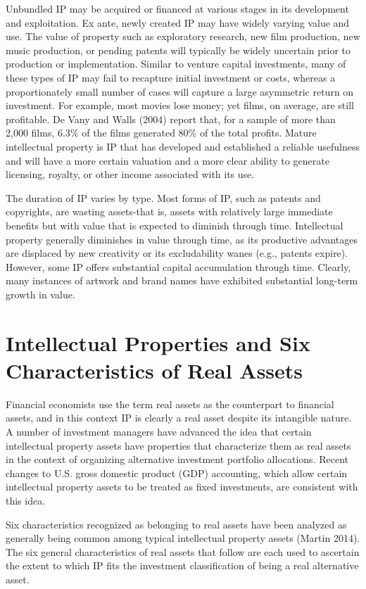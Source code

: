 \documentclass[11pt]{article}
\begin{document}
Unbundled IP may be acquired or financed at various stages in its development and exploitation. Ex ante, newly created IP may have widely varying value and use. The value of property such as exploratory research, new film production, new music production, or pending patents will typically be widely uncertain prior to production or implementation. Similar to venture capital investments, many of these types of IP may fail to recapture initial investment or costs, whereas a proportionately small number of cases will capture a large asymmetric return on investment. For example, most movies lose money; yet films, on average, are still profitable. De Vany and Walls (2004) report that, for a sample of more than 2,000 films, $6.3 \%$ of the films generated $80 \%$ of the total profits. Mature intellectual property is IP that has developed and established a reliable usefulness and will have a more certain valuation and a more clear ability to generate licensing, royalty, or other income associated with its use.

The duration of IP varies by type. Most forms of IP, such as patents and copyrights, are wasting assets-that is, assets with relatively large immediate benefits but with value that is expected to diminish through time. Intellectual property generally diminishes in value through time, as its productive advantages are displaced by new creativity or its excludability wanes (e.g., patents expire). However, some IP offers substantial capital accumulation through time. Clearly, many instances of artwork and brand names have exhibited substantial long-term growth in value.

\section*{Intellectual Properties and Six Characteristics of Real Assets}
Financial economists use the term real assets as the counterpart to financial assets, and in this context IP is clearly a real asset despite its intangible nature. A number of investment managers have advanced the idea that certain intellectual property assets have properties that characterize them as real assets in the context of organizing alternative investment portfolio allocations. Recent changes to U.S. gross domestic product (GDP) accounting, which allow certain intellectual property assets to be treated as fixed investments, are consistent with this idea.

Six characteristics recognized as belonging to real assets have been analyzed as generally being common among typical intellectual property assets (Martin 2014). The six general characteristics of real assets that follow are each used to ascertain the extent to which IP fits the investment classification of being a real alternative asset.
\end{document}

